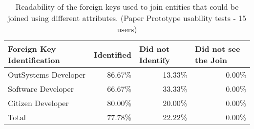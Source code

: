 

\begin{table}[tb]
  \caption{Readability of the foreign keys used to join entities that could be joined using different attributes. (Paper Prototype usability tests - 15 users)}
    \label{tab:paperPrototypeForeignKeyIdentification}
  \begin{tabular}{@{}lrrr@{}}
  \toprule
  \textbf{Foreign Key Identification} & \multicolumn{1}{l}{Identified} & \multicolumn{1}{l}{Did not Identify} & \multicolumn{1}{l}{Did not see the Join} \\ \midrule
  OutSystems Developer                & 86.67\%                        & 13.33\%                              & 0.00\%                                   \\
  Software Developer                  & 66.67\%                        & 33.33\%                              & 0.00\%                                   \\
  Citizen Developer                   & 80.00\%                        & 20.00\%                              & 0.00\%                                   \\
  Total                               & 77.78\%                        & 22.22\%                              & 0.00\%                                   \\ \bottomrule
  \end{tabular}
  \end{table}

